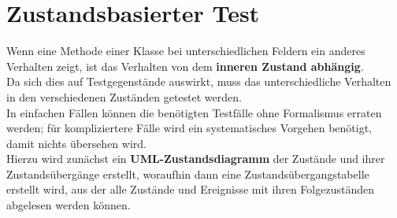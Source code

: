 \section{Zustandsbasierter Test}


\begin{tcolorbox}[title=Zustandsbasierter Test]
    Wenn eine Methode einer Klasse bei unterschiedlichen Feldern ein anderes Verhalten zeigt, ist das Verhalten von dem \textbf{inneren Zustand abhängig}.\\
    Da sich dies auf Testgegenstände auswirkt, muss das unterschiedliche Verhalten in den verschiedenen Zuständen getestet werden.\\

    \noindent
    In einfachen Fällen können die benötigten Testfälle ohne Formalismus erraten werden; für kompliziertere Fälle wird ein systematisches Vorgehen benötigt, damit nichts übersehen wird.\\
    Hierzu wird zunächst ein \textbf{UML-Zustandsdiagramm} der Zustände und ihrer Zustandsübergänge erstellt, woraufhin dann eine Zustandsübergangstabelle  erstellt wird, aus der alle Zustände und Ereignisse mit ihren Folgezuständen abgelesen werden können.
\end{tcolorbox}


